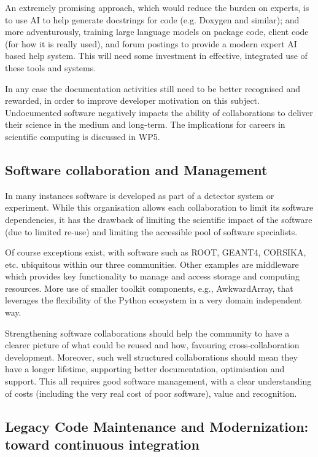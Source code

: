 An extremely promising approach, which would reduce the burden on experts, is to use AI to help generate docstrings for code (e.g. Doxygen and similar); and more adventurously, training large language models on package code, client code (for how it is really used), and forum postings to provide a modern expert AI based help system. This will need some investment in effective, integrated use of these tools and systems.

In any case the documentation activities still need to be better recognised and rewarded, in order to improve developer motivation on this subject.  Undocumented software negatively impacts the ability of collaborations to deliver their science in the medium and long-term.  The implications for careers in scientific computing is discussed in WP5.


\subsection{Software collaboration and Management}


In many instances software is developed as part of a detector system or experiment. While this organisation allows each collaboration to limit its software dependencies, it has the drawback of limiting the scientific impact of the software (due to limited re-use) and limiting the accessible pool of software specialists.

Of course exceptions exist, with software such as ROOT, GEANT4, CORSIKA, etc. ubiquitous within our three communities. Other examples are middleware which provides key functionality to manage and access storage and computing resources. More use of smaller toolkit components, e.g., AwkwardArray, that leverages the flexibility of the Python ecosystem in a very domain independent way.

Strengthening software collaborations should help the community to have a clearer picture of what could be reused and how, favouring cross-collaboration development. Moreover, such well structured collaborations should mean they have a longer lifetime, supporting better documentation, optimisation and support. This all requires good software management, with a clear understanding of costs (including the very real cost of poor software), value and recognition.


\subsection{Legacy Code Maintenance and Modernization: toward continuous integration}

